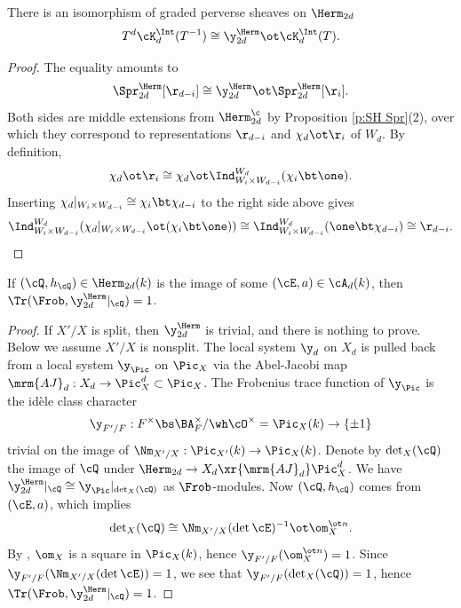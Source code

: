 \begin{lemma}
\notready There is an isomorphism of graded perverse sheaves on $\Herm_{2d}$
\begin{equation}
T^{d}\cK_d^{\Int}(T^{-1})\cong \y^{\Herm}_{2d}\ot \cK^{\Int}_{d}(T).
\end{equation}
\end{lemma}
\begin{proof}
The equality amounts to
\begin{equation}
\Spr^{\Herm}_{2d}[\r_{d-i}]\cong \y^{\Herm}_{2d}\ot\Spr^{\Herm}_{2d}[\r_{i}].
\end{equation}
Both sides are middle extensions from $\Herm^{\c}_{2d}$ by Proposition \ref{p:SH Spr}(2), over which they correspond to representations $\r_{d-i}$ and $\chi_{d}\ot \r_{i}$ of $W_{d}$. By definition,
\begin{equation}
\chi_{d}\ot\r_{i}\cong \chi_{d}\ot\Ind^{W_{d}}_{W_{i}\times W_{d-i}}(\chi_{i}\bt\one).
\end{equation}
Inserting $\chi_{d}|_{W_{i}\times W_{d-i}}\cong \chi_{i}\bt \chi_{d-i}$ to the right side above gives
\begin{equation}
\Ind^{W_{d}}_{W_{i}\times W_{d-i}}(\chi_{d}|_{W_{i}\times W_{d-i}}\ot(\chi_{i}\bt\one))\cong \Ind^{W_{d}}_{W_{i}\times W_{d-i}}(\one\bt\chi_{d-i})\cong \r_{d-i}.
\end{equation}
\end{proof}

\begin{lemma}
\notready
If $(\cQ,h_{\cQ})\in \Herm_{2d}(k)$ is the image of some $(\cE,a)\in \cA_{d}(k)$, then $\Tr(\Frob, \y^{\Herm}_{2d}|_{\cQ})=1$.
\end{lemma}
\begin{proof} If $X'/X$ is split, then $\y^{\Herm}_{2d}$ is trivial, and there is nothing to prove. Below we assume $X'/X$ is nonsplit. The local system $\y_{d}$ on $X_{d}$ is pulled back from a local system $\y_{\Pic}$ on $\Pic_{X}$ via the Abel-Jacobi map $\mrm{AJ}_{d}:X_{d}\to \Pic^{d}_{X}\subset \Pic_{X}$. The Frobenius trace function of $\y_{\Pic}$ is the id\`ele class character
\[
\y_{F'/F}: F^{\times}\bs\BA^{\times}_{F}/\wh\cO^{\times}=\Pic_{X}(k)\to\{\pm1\}
\]
trivial on the image of $\Nm_{X'/X}: \Pic_{X'}(k)\to \Pic_{X}(k)$. Denote by $\det_{X}(\cQ)$ the image of $\cQ$ under $\Herm_{2d}\to X_{d}\xr{\mrm{AJ}_{d}} \Pic^{d}_{X}$. We have $\y^{\Herm}_{2d}|_{\cQ}\cong \y_{\Pic}|_{\det_{X}(\cQ)}$ as $\Frob$-modules. Now $(\cQ,h_{\cQ})$ comes from $(\cE,a)$, which implies
\begin{equation*}
{\det}_{X}(\cQ)\cong \Nm_{X'/X}(\det\cE)^{-1}\ot \om_{X}^{\ot n}.
\end{equation*}
By \cite[p.291, Theorem 13]{Weil}, $\om_{X}$ is a square in $\Pic_{X}(k)$, hence $\y_{F'/F}(\om_{X}^{\ot n})=1$. Since $\y_{F'/F}(\Nm_{X'/X}(\det\cE))=1$, we see that $\y_{F'/F}(\det_{X}(\cQ))=1$, hence $\Tr(\Frob, \y^{\Herm}_{2d}|_{\cQ})=1$.
\end{proof}


